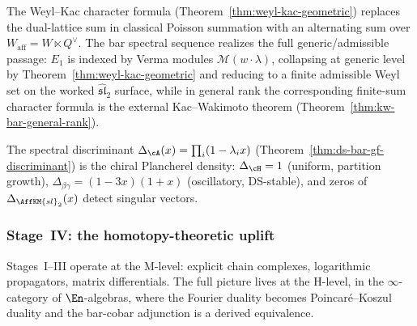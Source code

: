 \begin{remark}
\label{rem:weyl-nonabelian-fourier}
The Weyl--Kac character formula
\textup{(}Theorem~\textup{\ref{thm:weyl-kac-geometric}}\textup{)}
replaces the dual-lattice sum in classical Poisson summation with an
alternating sum over $W_{\mathrm{aff}} = W \ltimes Q^\vee$. The bar
spectral sequence realizes the full generic/admissible passage:
$E_1$ is indexed by Verma modules $\mathcal{M}(w \cdot \lambda)$,
collapsing at generic level by
Theorem~\ref{thm:weyl-kac-geometric} and reducing to a finite
admissible Weyl set on the worked $\widehat{\mathfrak{sl}}_2$
surface, while in general rank the corresponding finite-sum
character formula is the external
Kac--Wakimoto theorem
\textup{(}Theorem~\ref{thm:kw-bar-general-rank}\textup{)}.
\end{remark}

\begin{remark}
\label{rem:spectral-plancherel}
The spectral discriminant $\Delta_\cA(x) = \prod_i (1 - \lambda_i x)$ (Theorem~\ref{thm:ds-bar-gf-discriminant}) is the chiral Plancherel density: $\Delta_\cH = 1$ (uniform, partition growth), $\Delta_{\beta\gamma} = (1 - 3x)(1 + x)$ (oscillatory, DS-stable), and zeros of $\Delta_{\AffKM{sl}_2}(x)$ detect singular vectors.
\end{remark}

\subsubsection{Stage~IV: the homotopy-theoretic uplift}

Stages~I--III operate at the M-level: explicit chain complexes,
logarithmic propagators, matrix differentials. The full picture
lives at the H-level, in the $\infty$-category of $\En$-algebras,
where the Fourier duality becomes Poincar\'e--Koszul duality and the
bar-cobar adjunction is a derived equivalence.

